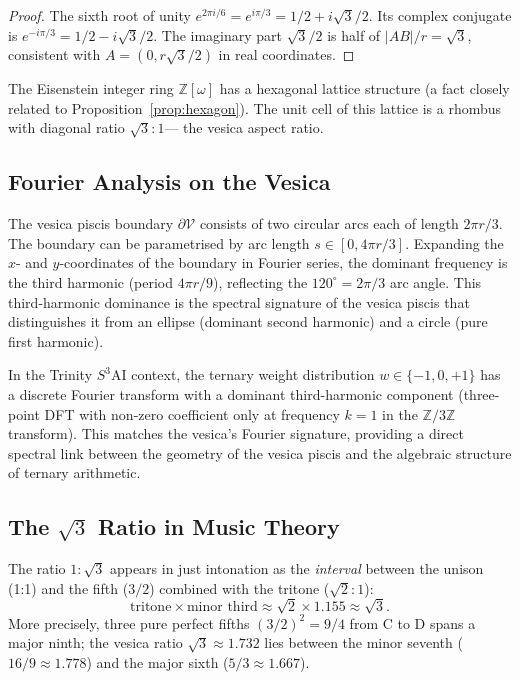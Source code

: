 \begin{proof}
The sixth root of unity \(e^{2\pi i/6} = e^{i\pi/3} = 1/2 + i\sqrt{3}/2\).
Its complex conjugate is \(e^{-i\pi/3} = 1/2 - i\sqrt{3}/2\).
The imaginary part \(\sqrt{3}/2\) is half of \(|AB|/r = \sqrt{3}\),
consistent with \(A = (0, r\sqrt{3}/2)\) in real coordinates.
\end{proof}

The Eisenstein integer ring \(\mathbb{Z}[\omega]\) has a hexagonal
lattice structure (a fact closely related to Proposition~\ref{prop:hexagon}).
The unit cell of this lattice is a rhombus with diagonal ratio \(\sqrt{3}:1\)—
the vesica aspect ratio.

\subsection{Fourier Analysis on the Vesica}
\label{subsec:ch11-fourier}

The vesica piscis boundary \(\partial\mathcal{V}\) consists of two
circular arcs each of length \(2\pi r/3\).
The boundary can be parametrised by arc length \(s \in [0, 4\pi r/3]\).
Expanding the \(x\)- and \(y\)-coordinates of the boundary in Fourier
series, the dominant frequency is the third harmonic (period \(4\pi r/9\)),
reflecting the \(120^\circ = 2\pi/3\) arc angle.
This third-harmonic dominance is the spectral signature of the vesica
piscis that distinguishes it from an ellipse (dominant second harmonic)
and a circle (pure first harmonic).

In the Trinity \(S^3\)AI context, the ternary weight distribution
\(w \in \{-1, 0, +1\}\) has a discrete Fourier transform with a dominant
third-harmonic component (three-point DFT with non-zero coefficient only
at frequency \(k=1\) in the \(\mathbb{Z}/3\mathbb{Z}\) transform).
This matches the vesica's Fourier signature, providing a direct
spectral link between the geometry of the vesica piscis and the
algebraic structure of ternary arithmetic.

\subsection{The \(\sqrt{3}\) Ratio in Music Theory}
\label{subsec:ch11-music}

The ratio \(1:\sqrt{3}\) appears in just intonation as the
\emph{interval} between the unison (1:1) and the fifth
(\(3/2\)) combined with the tritone (\(\sqrt{2}:1\)):
\[
  \text{tritone} \times \text{minor third} \approx \sqrt{2} \times 1.155 \approx \sqrt{3}.
\]
More precisely, three pure perfect fifths 
\((3/2)^2 = 9/4\) from C to D spans a major ninth;
the vesica ratio \(\sqrt{3} \approx 1.732\) lies between the
minor seventh (\(16/9 \approx 1.778\)) and the major sixth (\(5/3 \approx 1.667\)).

